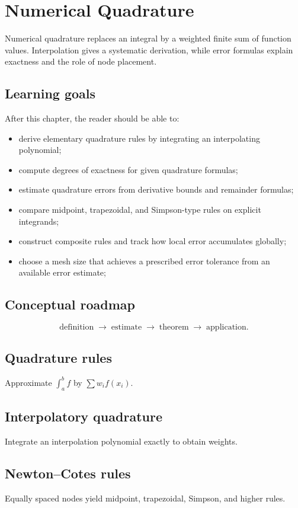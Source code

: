 \chapter{Numerical Quadrature}
\label{ch:ii24}

Numerical quadrature replaces an integral by a weighted finite sum of function values. Interpolation gives a systematic derivation, while error formulas explain exactness and the role of node placement.

\section*{Learning goals}
After this chapter, the reader should be able to:
\begin{itemize}
\item derive elementary quadrature rules by integrating an interpolating polynomial;
\item compute degrees of exactness for given quadrature formulas;
\item estimate quadrature errors from derivative bounds and remainder formulas;
\item compare midpoint, trapezoidal, and Simpson-type rules on explicit integrands;
\item construct composite rules and track how local error accumulates globally;
\item choose a mesh size that achieves a prescribed error tolerance from an available error estimate;
\end{itemize}
\section*{Conceptual roadmap}
\[
\boxed{\text{definition}\;\longrightarrow\;\text{estimate}\;\longrightarrow\;\text{theorem}\;\longrightarrow\;\text{application}.}
\]

\section{Quadrature rules}
Approximate $\int_a^bf$ by $\sum w_if(x_i)$.

\section{Interpolatory quadrature}
Integrate an interpolation polynomial exactly to obtain weights.

\section{Newton--Cotes rules}
Equally spaced nodes yield midpoint, trapezoidal, Simpson, and higher rules.

